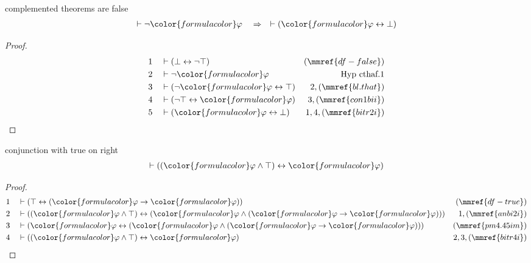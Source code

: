 \begin{lemma} complemented theorems are false
\begin{align}
\vdash \lnot {\color{formulacolor}\varphi}\quad\Rightarrow\quad \vdash (
    {\color{formulacolor}\varphi} \leftrightarrow \bot )\label{bl.cthaf}
\end{align}
\end{lemma}

\begin{proof}
\begin{align}
  1 && & \vdash ( \bot \leftrightarrow \lnot \top )&(\mmref{df-false})\notag
  \\ 2 && & \vdash \lnot
{\color{formulacolor}\varphi}&\text{Hyp~cthaf.1}\notag%
  \\ 3 && & \vdash ( \lnot {\color{formulacolor}\varphi} \leftrightarrow \top
      )&2,(\mmref{bl.that})\notag
  \\ 4 && & \vdash ( \lnot \top \leftrightarrow {\color{formulacolor}\varphi}
      )&3,(\mmref{con1bii})\notag
  \\ 5 && & \vdash ( {\color{formulacolor}\varphi} \leftrightarrow \bot
      )&1,4,(\mmref{bitr2i})\notag
\end{align}
\end{proof}

\begin{lemma} conjunction with true on right
\begin{align}
\vdash ( ( {\color{formulacolor}\varphi} \wedge \top ) \leftrightarrow
    {\color{formulacolor}\varphi} )\label{bl.antrr}
\end{align}
\end{lemma}

\begin{proof}
\begin{align}
  1 && & \vdash ( \top \leftrightarrow ( {\color{formulacolor}\varphi}
      \rightarrow {\color{formulacolor}\varphi} )
      )&(\mmref{df-true})\notag
  \\ 2 && & \vdash ( ( {\color{formulacolor}\varphi} \wedge \top )
      \leftrightarrow ( {\color{formulacolor}\varphi}
      \wedge ( {\color{formulacolor}\varphi} \rightarrow
      {\color{formulacolor}\varphi} ) )
      )&1,(\mmref{anbi2i})\notag
  \\ 3 && & \vdash ( {\color{formulacolor}\varphi} \leftrightarrow (
      {\color{formulacolor}\varphi} \wedge (
      {\color{formulacolor}\varphi} \rightarrow
      {\color{formulacolor}\varphi} ) )
      )&(\mmref{pm4.45im})\notag
  \\ 4 && & \vdash ( ( {\color{formulacolor}\varphi} \wedge \top )
      \leftrightarrow {\color{formulacolor}\varphi}
      )&2,3,(\mmref{bitr4i})\notag
\end{align}
\end{proof}

